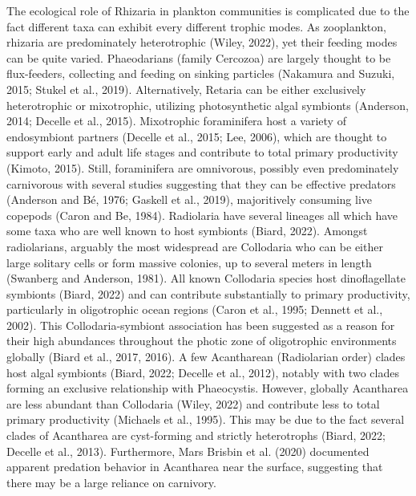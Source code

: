 \documentclass[
  letterpaper,
  DIV=11,
  numbers=noendperiod]{scrartcl}
\begin{document}
The ecological role of Rhizaria in plankton communities is complicated
due to the fact different taxa can exhibit every different trophic
modes. As zooplankton, rhizaria are predominately heterotrophic (Wiley,
2022), yet their feeding modes can be quite varied. Phaeodarians (family
Cercozoa) are largely thought to be flux-feeders, collecting and feeding
on sinking particles (Nakamura and Suzuki, 2015; Stukel et al., 2019).
Alternatively, Retaria can be either exclusively heterotrophic or
mixotrophic, utilizing photosynthetic algal symbionts (Anderson, 2014;
Decelle et al., 2015). Mixotrophic foraminifera host a variety of
endosymbiont partners (Decelle et al., 2015; Lee, 2006), which are
thought to support early and adult life stages and contribute to total
primary productivity (Kimoto, 2015). Still, foraminifera are omnivorous,
possibly even predominately carnivorous with several studies suggesting
that they can be effective predators (Anderson and Bé, 1976; Gaskell et
al., 2019), majoritively consuming live copepods (Caron and Be, 1984).
Radiolaria have several lineages all which have some taxa who are well
known to host symbionts (Biard, 2022). Amongst radiolarians, arguably
the most widespread are Collodaria who can be either large solitary
cells or form massive colonies, up to several meters in length (Swanberg
and Anderson, 1981). All known Collodaria species host dinoflagellate
symbionts (Biard, 2022) and can contribute substantially to primary
productivity, particularly in oligotrophic ocean regions (Caron et al.,
1995; Dennett et al., 2002). This Collodaria-symbiont association has
been suggested as a reason for their high abundances throughout the
photic zone of oligotrophic environments globally (Biard et al., 2017,
2016). A few Acantharean (Radiolarian order) clades host algal symbionts
(Biard, 2022; Decelle et al., 2012), notably with two clades forming an
exclusive relationship with Phaeocystis. However, globally Acantharea
are less abundant than Collodaria (Wiley, 2022) and contribute less to
total primary productivity (Michaels et al., 1995). This may be due to
the fact several clades of Acantharea are cyst-forming and strictly
heterotrophs (Biard, 2022; Decelle et al., 2013). Furthermore, Mars
Brisbin et al. (2020) documented apparent predation behavior in
Acantharea near the surface, suggesting that there may be a large
reliance on carnivory.
\end{document}
